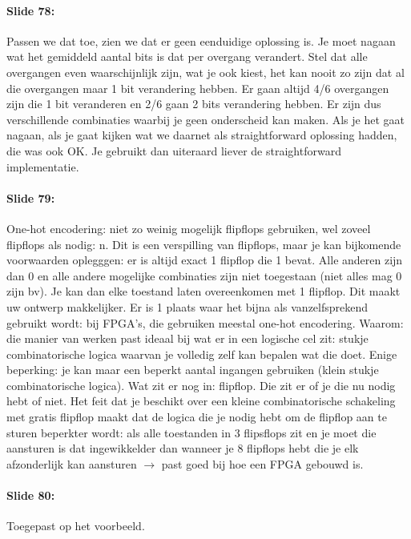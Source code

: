 \documentclass[10pt,a4paper]{book}
\begin{document}
\paragraph{Slide 78:} Passen we dat toe, zien we dat er geen eenduidige oplossing is. Je moet nagaan wat het gemiddeld aantal bits is dat per overgang verandert. Stel dat alle overgangen even waarschijnlijk zijn, wat je ook kiest, het kan nooit zo zijn dat al die overgangen maar 1 bit verandering hebben. Er gaan altijd 4/6 overgangen zijn die 1 bit veranderen en 2/6 gaan 2 bits verandering hebben. Er zijn dus verschillende combinaties waarbij je geen onderscheid kan maken. Als je het gaat nagaan, als je gaat kijken wat we daarnet als straightforward oplossing hadden, die was ook OK. Je gebruikt dan uiteraard liever de straightforward implementatie. 

\paragraph{Slide 79:} One-hot encodering: niet zo weinig mogelijk flipflops gebruiken, wel zoveel flipflops als nodig: n. Dit is een verspilling van flipflops, maar je kan bijkomende voorwaarden oplegggen: er is altijd exact 1 flipflop die 1 bevat. Alle anderen zijn dan 0 en alle andere mogelijke combinaties zijn niet toegestaan (niet alles mag 0 zijn bv). Je kan dan elke toestand laten overeenkomen met 1 flipflop. Dit maakt uw ontwerp makkelijker. Er is 1 plaats waar het bijna als vanzelfsprekend gebruikt wordt: bij FPGA's, die gebruiken meestal one-hot encodering. Waarom: die manier van werken past ideaal bij wat er in een logische cel zit: stukje combinatorische logica waarvan je volledig zelf kan bepalen wat die doet. Enige beperking: je kan maar een beperkt aantal ingangen gebruiken (klein stukje combinatorische logica). Wat zit er nog in: flipflop. Die zit er of je die nu nodig hebt of niet. Het feit dat je beschikt over een kleine combinatorische schakeling met gratis flipflop maakt dat de logica die je nodig hebt om de flipflop aan te sturen beperkter wordt: als alle toestanden in 3 flipsflops zit en je moet die aansturen is dat ingewikkelder dan wanneer je 8 flipflops hebt die je elk afzonderlijk kan aansturen $\rightarrow$ past goed bij hoe een FPGA gebouwd is. 

\paragraph{Slide 80:} Toegepast op het voorbeeld.
\end{document}
